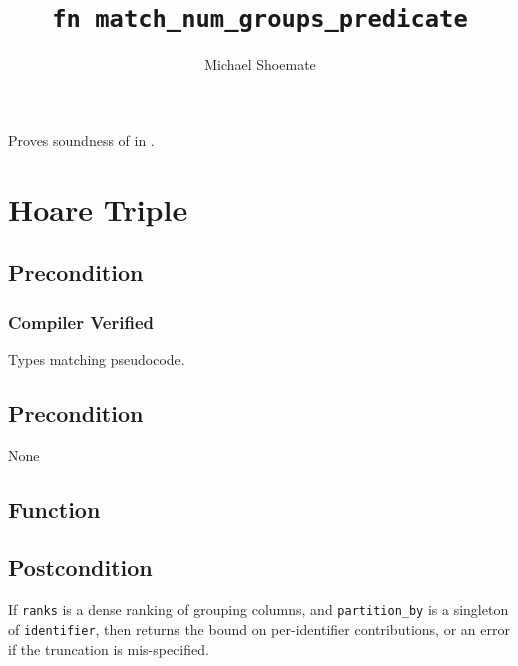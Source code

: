 \documentclass{article}
\title{\texttt{fn match\_num\_groups\_predicate}}
\author{Michael Shoemate}
\begin{document}
\maketitle  


\contrib

Proves soundness of  
in .

\section{Hoare Triple}
\subsection*{Precondition}
\subsubsection*{Compiler Verified}
Types matching pseudocode.

\subsection*{Precondition}
None 

\subsection*{Function}
\label{sec:python-pseudocode}


\subsection*{Postcondition}
\begin{theorem}[Postcondition]
    If \texttt{ranks} is a dense ranking of grouping columns,
    and \texttt{partition\_by} is a singleton of \texttt{identifier},
    then returns the bound on per-identifier contributions, 
    or an error if the truncation is mis-specified.
\end{theorem}
\end{document}

